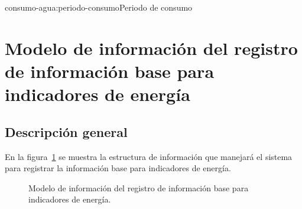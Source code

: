 \begin{BusinessFact}{consumo-agua:periodo-consumo}{Periodo de consumo}
\end{BusinessFact}


\section{Modelo de información del registro de información base para indicadores de energía}

\subsection{Descripción general}
 En la figura~\ref{fig:registroInfoBaseEnergia} se muestra la estructura de información que manejará el sistema para registrar la información base para indicadores de energía.
 
\begin{figure}[htbp!]
      \begin{center}
            \caption{Modelo de información del registro de información base para indicadores de energía.}
            \label{fig:registroInfoBaseEnergia}
      \end{center}
\end{figure}

